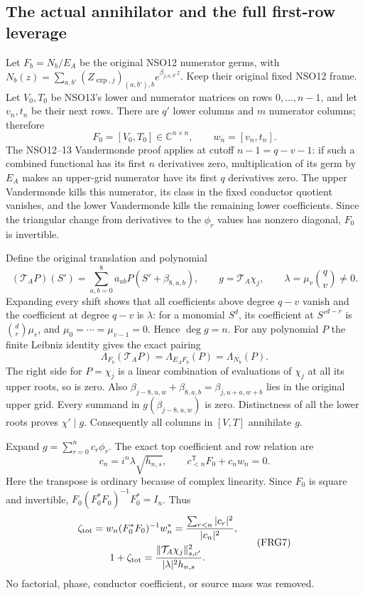 \documentclass[11pt,a4paper]{article}
\begin{document}
\subsection{The actual annihilator and the full first-row leverage}
Let $F_b=N_b/E_A$ be the original NSO12 numerator germs, with
$N_b(z)=\sum_{a,b'}(Z_{\exp,j})_{(a,b'),b}e^{\beta_{j,a,b'}z}$.
Keep their original fixed NSO12 frame. Let $V_0,T_0$ be NSO13's lower
and numerator matrices on rows $0,\ldots,n-1$, and let $v_n,t_n$ be
their next rows. There are $q'$ lower columns and $m$ numerator columns;
therefore
\[
F_0=[V_0,T_0]\in\mathbb C^{n\times n},\qquad w_n=[v_n,t_n].
\tag{FRG3}
\]
The NSO12--13 Vandermonde proof applies at cutoff $n-1=q-v-1$:
if such a combined functional has its first $n$ derivatives zero,
multiplication of its germ by $E_A$ makes an upper-grid numerator
have its first $q$ derivatives zero. The upper Vandermonde kills this
numerator, its class in the fixed conductor quotient vanishes, and the
lower Vandermonde kills the remaining lower coefficients. Since the
triangular change from derivatives to the $\phi_r$ values has nonzero
diagonal, $F_0$ is invertible.

Define the original translation and polynomial
\[
(\mathcal T_AP)(S')=\sum_{a,b=0}^8a_{ab}P(S'+\beta_{8,a,b}),
\qquad g=\mathcal T_A\chi_j,\qquad
\lambda=\mu_v\binom qv\ne0.
\tag{FRG4}
\]
Expanding every shift shows that all coefficients above degree $q-v$
vanish and the coefficient at degree $q-v$ is $\lambda$: for a monomial
$S^d$, its coefficient at $S'^{d-r}$ is $\binom dr\mu_r$, and
$\mu_0=\cdots=\mu_{v-1}=0$. Hence $\deg g=n$.
For any polynomial $P$ the finite Leibniz identity gives the exact pairing
\[
\Lambda_{F_b}(\mathcal T_AP)=\Lambda_{E_AF_b}(P)=\Lambda_{N_b}(P).
\tag{FRG5}
\]
The right side for $P=\chi_j$ is a linear combination of evaluations
of $\chi_j$ at all its upper roots, so is zero. Also
$\beta_{j-8,u,w}+\beta_{8,a,b}=\beta_{j,u+a,w+b}$ lies in the
original upper grid. Every summand in $g(\beta_{j-8,u,w})$ is zero.
Distinctness of all the lower roots proves $\chi'\mid g$.
Consequently all columns in $[V,T]$ annihilate $g$.

Expand $g=\sum_{r=0}^nc_r\phi_r$. The exact top coefficient and row
relation are
\[
c_n=i^n\lambda\sqrt{h_{n,s}},\qquad
c_{<n}^{\mathsf T}F_0+c_nw_n=0.
\tag{FRG6}
\]
Here the transpose is ordinary because of complex linearity.
Since $F_0$ is square and invertible,
$F_0(F_0^*F_0)^{-1}F_0^*=I_n$. Thus
\[
\begin{gathered}
\zeta_{\rm tot}=w_n(F_0^*F_0)^{-1}w_n^*
 =\frac{\sum_{r<n}|c_r|^2}{|c_n|^2},\\
1+\zeta_{\rm tot}
 =\frac{\|\mathcal T_A\chi_j\|_{s,c'}^2}{|\lambda|^2h_{n,s}}.
\end{gathered}\tag{FRG7}
\]
No factorial, phase, conductor coefficient, or source mass was removed.
\end{document}
